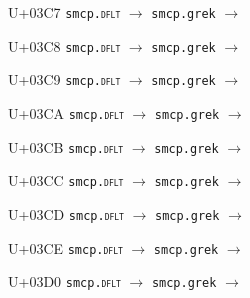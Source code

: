 \documentclass{article}
\begin{document}
\begin{substitutions}
\goodbreak

U+03C7  \linebreak
    \texttt{smcp.\textsc{dflt}} $\to$  \linebreak
    \texttt{smcp.grek} $\to$  

\goodbreak

U+03C8  \linebreak
    \texttt{smcp.\textsc{dflt}} $\to$  \linebreak
    \texttt{smcp.grek} $\to$  

\goodbreak

U+03C9  \linebreak
    \texttt{smcp.\textsc{dflt}} $\to$  \linebreak
    \texttt{smcp.grek} $\to$  

\goodbreak

U+03CA  \linebreak
    \texttt{smcp.\textsc{dflt}} $\to$  \linebreak
    \texttt{smcp.grek} $\to$  

\goodbreak

U+03CB  \linebreak
    \texttt{smcp.\textsc{dflt}} $\to$  \linebreak
    \texttt{smcp.grek} $\to$  

\goodbreak

U+03CC  \linebreak
    \texttt{smcp.\textsc{dflt}} $\to$  \linebreak
    \texttt{smcp.grek} $\to$  

\goodbreak

U+03CD  \linebreak
    \texttt{smcp.\textsc{dflt}} $\to$  \linebreak
    \texttt{smcp.grek} $\to$  

\goodbreak

U+03CE  \linebreak
    \texttt{smcp.\textsc{dflt}} $\to$  \linebreak
    \texttt{smcp.grek} $\to$  

\goodbreak

U+03D0  \linebreak
    \texttt{smcp.\textsc{dflt}} $\to$  \linebreak
    \texttt{smcp.grek} $\to$  


\end{substitutions}
\end{document}
